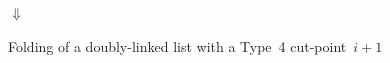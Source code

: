 \begin{figure}[t]
  \centering
    \parbox{0.7\textwidth}{\centering}

    $\Downarrow$

    \parbox{0.7\textwidth}{\centering}

  \caption{Folding of a doubly-linked list with a Type~4 cut-point~$i+1$}
  \label{fig:dllelim}
\end{figure}




